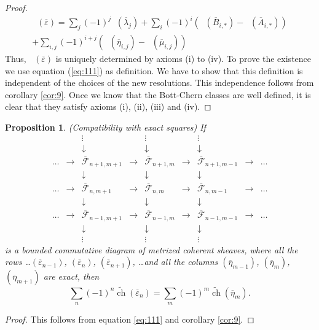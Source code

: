 \documentclass[10pt,twoside]{article}
\numberwithin{equation}{section}
\theoremstyle{plain}
\newtheorem{proposition}[equation]{Proposition}
\theoremstyle{definition}
\DeclareMathOperator{\cht}{\widetilde{ch}}
\DeclareMathOperator{\ch}{ch}
\begin{document}
\begin{proof}
\begin{multline}
  \cht(\overline{\varepsilon })=\sum_{j}(-1)^{j}\cht(\overline{\lambda
  }_{j})
  + \sum _{i}(-1)^{i}(\cht(\overline B_{i,\ast})-\cht(\overline A_{i,\ast}))\\
  +\sum_{i,j}(-1)^{i+j}(\cht(\overline{\eta}_{i,j})-\cht(\overline{\mu}_{i,j})) 
\end{multline}
Thus, $\cht(\overline{\varepsilon })$ is uniquely determined by axioms
(i) to (iv).
  To prove the existence we use equation (\ref{eq:111}) as
  definition.   
  We have to show that this definition is independent of the choices of
  the new resolutions. This
  independence follows from corollary \ref{cor:9}. Once we know that
  the Bott-Chern classes are well defined, it is clear that they
  satisfy axioms (i), (ii), (iii) and (iv).
\end{proof}

\begin{proposition} \label{prop:21}
    (Compatibility with exact squares) If
      $$\begin{array}{ccccccccc}
        && \vdots && \vdots && \vdots && \\
        && \downarrow && \downarrow && \downarrow && \\
        \dots & \rightarrow & \overline{\mathcal{F}}_{n+1,m+1} & \rightarrow &
        \overline{\mathcal{F}}_{n+1,m} & \rightarrow &
        \overline{\mathcal{F}}_{n+1,m-1} & \rightarrow & \dots \\
        && \downarrow && \downarrow && \downarrow && \\
        \dots & \rightarrow & \overline{\mathcal{F}}_{n,m+1} & \rightarrow &
        \overline{\mathcal{F}}_{n,m} & \rightarrow &
        \overline{\mathcal{F}}_{n,m-1} & \rightarrow & \dots \\
        && \downarrow && \downarrow && \downarrow && \\
        \dots & \rightarrow & \overline{\mathcal{F}}_{n-1,m+1} & \rightarrow &
        \overline{\mathcal{F}}_{n-1,m} & \rightarrow &
        \overline{\mathcal{F}}_{n-1,m-1} & \rightarrow & \dots \\
        && \downarrow && \downarrow && \downarrow && \\
        && \vdots && \vdots && \vdots &&
      \end{array}$$
      is a bounded commutative diagram of metrized coherent sheaves,
      where all the 
      rows \dots $(\overline{\varepsilon}_{n-1})$,
      $(\overline{\varepsilon}_{n})$, 
      $(\overline{\varepsilon}_{n+1})$, \dots and all the columns
      $(\overline{\eta}_{m-1})$, $(\overline{\eta}_{m})$,
      $(\overline{\eta}_{m+1})$ 
      are exact, then
      $$\sum_{n}(-1)^{n}\widetilde{\ch}(\overline{\varepsilon}_{n}) =
      \sum_{m}(-1)^{m}\widetilde{\ch}(\overline{\eta}_m)
      .$$  
\end{proposition}
\begin{proof}
  This follows from equation \eqref{eq:111} and corollary \ref{cor:9}.
\end{proof}
\end{document}
